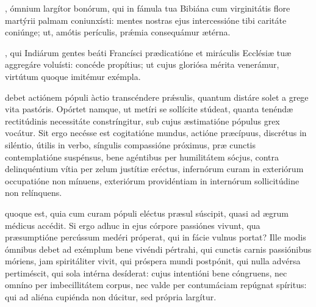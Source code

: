 \documentclass[fontsize=9pt,paper=A6,twoside,BCOR=1mm,DIV=22,headinclude]{scrarticle}
\begin{document}
\begin{multicols}{2}
{


\AiiiV

\VRViii

, ómnium largítor bonórum, qui in fámula tua Bibiána cum virginitátis flore martýrii palmam coniunxísti: mentes nostras ejus intercessióne tibi caritáte coniúnge; ut, amótis perículis, prǽmia consequámur ætérna.


\AiiC 

\VRCi 

, qui Indiárum gentes beáti Francísci prædicatióne et miráculis Ecclésiæ tuæ aggregáre voluísti: concéde propítius; ut cujus gloriósa mérita venerámur, virtútum quoque imitémur exémpla.


 debet actiónem pópuli àctio transcéndere pr\'æsulis, quantum distáre solet a grege vita pastóris. Opórtet namque, ut metíri se sollícite stúdeat, quanta tenéndæ rectitúdinis necessitáte constríngitur, sub cujus æstimatióne pópulus grex vocátur. Sit ergo necésse est cogitatióne mundus, actióne præcípuus, discrétus in siléntio, útilis in verbo, síngulis compassióne próximus, præ cunctis contemplatióne suspénsus, bene agéntibus per humilitátem sócjus, contra delinquéntium vítia per zelum justítiæ eréctus, infernórum curam in exteriórum occupatióne non mínuens, exteriórum providéntiam in internórum sollicitúdine non relínquens.

\RVCPiv 

 quoque est, quia cum curam pópuli eléctus præsul súscipit, quasi ad ægrum médicus accédit. Si ergo adhuc in ejus córpore passiónes vivunt, qua præsumptióne percússum medéri próperat, qui in fácie vulnus portat? Ille modis ómnibus debet ad exémplum bene vivéndi pértrahi, qui cunctis carnis passiónibus móriens, jam spiritáliter vivit, qui próspera mundi postpónit, qui nulla advérsa pertiméscit, qui sola intérna desíderat: cujus intentióni bene cóngruens, nec omníno per imbecillitátem corpus, nec valde per contumáciam repúgnat spíritus: qui ad aliéna cupiénda non dúcitur, sed própria largítur.

\RVCPv 

}
\end{multicols}
\end{document}

